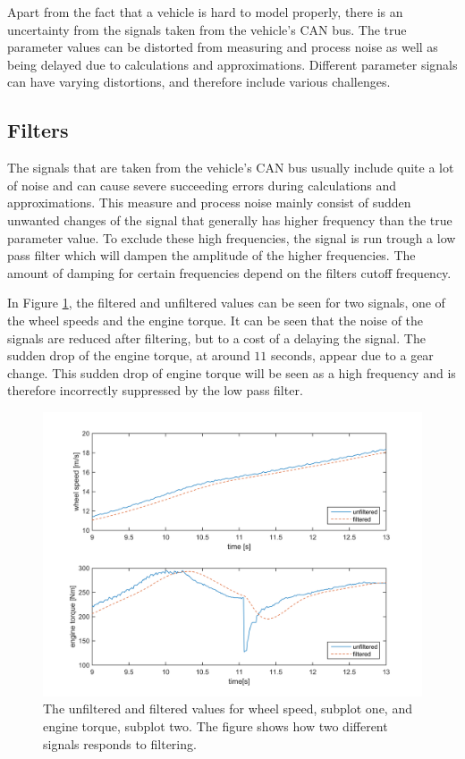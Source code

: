 Apart from the fact that a vehicle is hard to model properly, there is an uncertainty from the signals taken from the vehicle's CAN bus. The true parameter values can be distorted from measuring and process noise as well as being delayed due to calculations and approximations. Different parameter signals can have varying distortions, and therefore include various challenges.

\subsection{Filters}

The signals that are taken from the vehicle's CAN bus usually include quite a lot of noise and can cause severe succeeding errors during calculations and approximations. This measure and process noise mainly consist of sudden unwanted changes of the signal that generally has higher frequency than the true parameter value. To exclude these high frequencies, the signal is run trough a low pass filter which will dampen the amplitude of the higher frequencies. The amount of damping for certain frequencies depend on the filters cutoff frequency. 

In Figure \ref{filter_and_no}, the filtered and unfiltered values can be seen for two signals, one of the wheel speeds and the engine torque. It can be seen that the noise of the signals are reduced after filtering, but to a cost of a delaying the signal. The sudden drop of the engine torque, at around $ 11 $ seconds, appear due to a gear change. This sudden drop of engine torque will be seen as a high frequency and is therefore incorrectly suppressed by the low pass filter.

\begin{figure}[h]
	\centering
	\includegraphics[width=1.0\textwidth]{Pictures/filter_and_no}
	\caption {The unfiltered and filtered values for wheel speed, subplot one, and engine torque, subplot two. The figure shows how two different signals responds to filtering.}
	\label{filter_and_no}
\end{figure}

